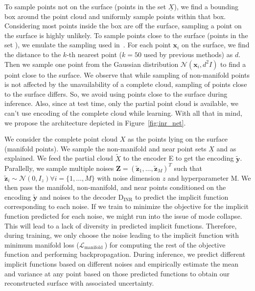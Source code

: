     To sample points not on the surface (points in the set $\underline{X}$), we find a bounding box around the point cloud and uniformly sample points within that box. Considering most points inside the box are off the surface, sampling a point on the surface is highly unlikely. To sample points close to the surface (points in the set ), we emulate the sampling used in~\cite{IGR, SALD, NeuralHessian}. For each point $\mathbf{x}_i$ on the surface, we find the distance to the $k$-th nearest point ($k=50$ used by previous methods) as $d$. Then we sample one point from the Gaussian distribution $\mathcal{N}(\mathbf{x}_i, d^2I)$ to find a point close to the surface. We observe that while sampling of non-manifold points is not affected by the unavailability of a complete cloud, sampling of points close to the surface differs. So, we avoid using points close to the surface during inference. Also, since at test time, only the partial point cloud is available, we can't use encoding of the complete cloud while learning. With all that in mind, we propose the architecture depicted in Figure~\ref{fig:inr_net}.
    \newline
    
    We consider the complete point cloud $X$ as the points lying on the surface (manifold points). We sample the non-manifold and near point sets $\underline{X}$ and  as explained. We feed the partial cloud $\tilde{X}$ to the encoder E to get the encoding $\mathbf{\tilde{y}}$. Parallelly, we sample multiple noises $\mathbf{Z} = (\mathbf{\tilde{z}}_1, \ldots, \mathbf{\tilde{z}}_M)^T$ such that $\mathbf{\tilde{z}}_i \sim \mathcal{N}(0, I_z) \forall i=\{1, \ldots, M\}$ with noise dimension $z$ and hyperparameter M. We then pass the manifold, non-manifold, and near points conditioned on the encoding $\mathbf{\tilde{y}}$ and noises to the decoder D$_{\text{INR}}$ to predict the implicit function corresponding to each noise. If we train to minimize the objective for the implicit function predicted for each noise, we might run into the issue of mode collapse. This will lead to a lack of diversity in predicted implicit functions. Therefore, during training, we only choose the noise leading to the implicit function with minimum manifold loss ($\mathcal{L}_{\text {manifold }}$) for computing the rest of the objective function and performing backpropagation. During inference, we predict different implicit functions based on different noises and empirically estimate the mean and variance at any point based on those predicted functions to obtain our reconstructed surface with associated uncertainty.
    \newline
    
